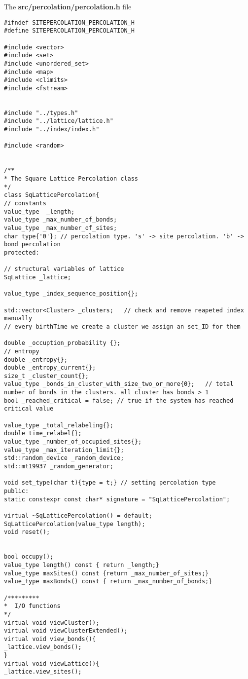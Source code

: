 
The \textbf{src/percolation/percolation.h} file

\begin{lstlisting}[style=CStyle]
#ifndef SITEPERCOLATION_PERCOLATION_H
#define SITEPERCOLATION_PERCOLATION_H

#include <vector>
#include <set>
#include <unordered_set>
#include <map>
#include <climits>
#include <fstream>


#include "../types.h"
#include "../lattice/lattice.h"
#include "../index/index.h"

#include <random>


/**
* The Square Lattice Percolation class
*/
class SqLatticePercolation{
// constants
value_type  _length;
value_type _max_number_of_bonds;
value_type _max_number_of_sites;
char type{'0'}; // percolation type. 's' -> site percolation. 'b' -> bond percolation
protected:

// structural variables of lattice
SqLattice _lattice;

value_type _index_sequence_position{};

std::vector<Cluster> _clusters;   // check and remove reapeted index manually
// every birthTime we create a cluster we assign an set_ID for them

double _occuption_probability {};
// entropy
double _entropy{};
double _entropy_current{};
size_t _cluster_count{};
value_type _bonds_in_cluster_with_size_two_or_more{0};   // total number of bonds in the clusters. all cluster has bonds > 1
bool _reached_critical = false; // true if the system has reached critical value

value_type _total_relabeling{};
double time_relabel{};
value_type _number_of_occupied_sites{};
value_type _max_iteration_limit{};
std::random_device _random_device;
std::mt19937 _random_generator;

void set_type(char t){type = t;} // setting percolation type
public:
static constexpr const char* signature = "SqLatticePercolation";

virtual ~SqLatticePercolation() = default;
SqLatticePercolation(value_type length);
void reset();


bool occupy();
value_type length() const { return _length;}
value_type maxSites() const {return _max_number_of_sites;}
value_type maxBonds() const { return _max_number_of_bonds;}

/*********
*  I/O functions
*/
virtual void viewCluster();
virtual void viewClusterExtended();
virtual void view_bonds(){
_lattice.view_bonds();
}
virtual void viewLattice(){
_lattice.view_sites();


\end{lstlisting}
